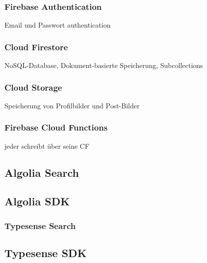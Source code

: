 \subsubsection{Firebase Authentication}
\author{Sandin Habibovic}
Email und Passwort authentication

\subsubsection{Cloud Firestore}
\author{Sandin Habibovic}
NoSQL-Database, Dokument-basierte Speicherung, Subcollections
\subsubsection{Cloud Storage}
\author{Sandin Habibovic}
Speicherung von Profilbilder und Post-Bilder
\subsubsection{Firebase Cloud Functions}
jeder schreibt über seine CF

\subsection{Algolia Search}
\subsection{Algolia SDK}

\subsubsection{Typesense Search}
\subsection{Typesense SDK}
